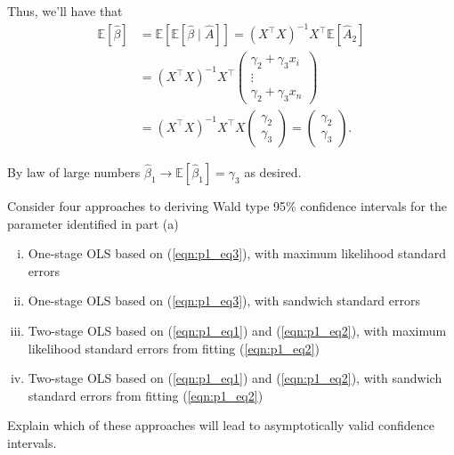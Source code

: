 \documentclass[11pt, letterpaper]{article}
\begin{document}
\begin{enumerate}[(a)]
\begin{description}
    Thus, we'll have that
    \begin{align*}
      \mathbb{E}\left[
      \hat{\beta}
      \right]
      &= \mathbb{E}\left[\mathbb{E}\left[
        \hat{\beta}
        \mid
        \hat{A}
        \right]
        \right]
        =
        \left(X^\intercal X\right)^{-1}X^\intercal\mathbb{E}\left[\hat{A}_2\right] \\
      &=
        \left(X^\intercal X\right)^{-1}X^\intercal
        \begin{pmatrix}
          \gamma_2 + \gamma_3x_i \\
          \vdots\\
          \gamma_2 + \gamma_3x_n
        \end{pmatrix} \\
      &= \left(X^\intercal X\right)^{-1}X^\intercal X\begin{pmatrix}
        \gamma_2 \\ \gamma_3
      \end{pmatrix}
      = \begin{pmatrix}
        \gamma_2 \\ \gamma_3
      \end{pmatrix}.
    \end{align*}

    By law of large numbers
    $\hat{\beta}_1 \rightarrow \mathbb{E}\left[\hat{\beta}_1\right] = \gamma_3$
    as desired.
  \end{description}
  
  {\em\item Consider four approaches to deriving Wald type 95\% confidence intervals for the parameter identified in part (a) 
\begin{enumerate}[i.]
\item One-stage OLS based on (\ref{eqn:p1_eq3}), with maximum likelihood standard errors
\item One-stage OLS based on (\ref{eqn:p1_eq3}), with sandwich standard errors
\item Two-stage OLS based on (\ref{eqn:p1_eq1}) and (\ref{eqn:p1_eq2}), with maximum likelihood standard errors from fitting  (\ref{eqn:p1_eq2})
\item Two-stage OLS based on (\ref{eqn:p1_eq1}) and (\ref{eqn:p1_eq2}), with sandwich standard errors from fitting (\ref{eqn:p1_eq2})
\end{enumerate}
Explain which of these approaches will lead to asymptotically valid confidence intervals.}


\end{enumerate}
\end{document}
